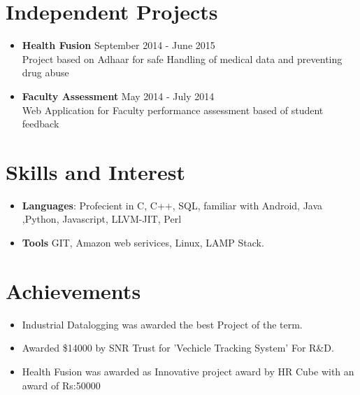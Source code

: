 \documentclass[letterpaper,11pt]{article}
\newcommand{\resumeSubHeadingListStart}{\begin{itemize}[leftmargin=*]}
\newcommand{\resumeSubHeadingListEnd}{\end{itemize}}
\begin{document}
\section{Independent Projects}
\resumeSubHeadingListStart
\item{
  \textbf{{Health Fusion}}
\hfill
{September 2014 - June 2015}\\
  {Project based on Adhaar for safe Handling of medical data and preventing drug abuse }{}
   }  
\item{
  \textbf{{Faculty Assessment}}
\hfill
{May 2014 - July 2014}\\
  {Web Application for Faculty performance assessment based of student feedback}{}
   }
 

\resumeSubHeadingListEnd
\section{Skills and Interest}
 \resumeSubHeadingListStart
   \item{
     \textbf{Languages}{: Profecient in C, C++, SQL, familiar with Android, Java ,Python, Javascript, LLVM-JIT, Perl}
    }
   \item{
    \textbf{Tools} GIT, Amazon web serivices, Linux, LAMP Stack.
  }
 \resumeSubHeadingListEnd
\section{Achievements}
\resumeSubHeadingListStart
\item{
{
  Industrial Datalogging was awarded the best Project of the term.
}}   
\item{
{Awarded \$14000 by SNR Trust for 'Vechicle Tracking System' For R\&D.}   
} 
\item{
{ Health Fusion was awarded as Innovative project award by HR Cube with an award of Rs:50000}}
   
 \resumeSubHeadingListEnd



\end{document}
